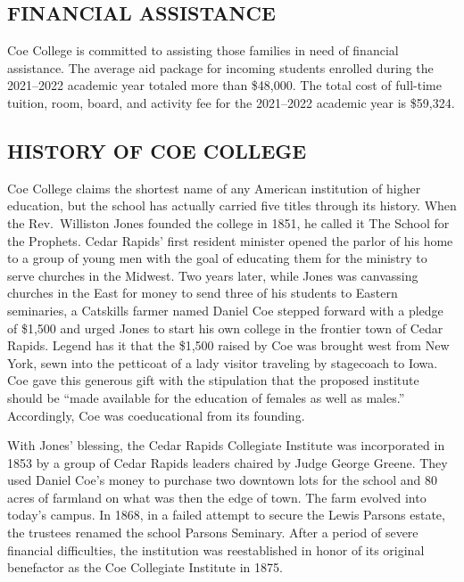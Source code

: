 \documentclass[
  letterpaper,
]{scrbook}
\begin{document}
\subsection{FINANCIAL ASSISTANCE}\label{financial-assistance}

Coe College is committed to assisting those families in need of
financial assistance. The average aid package for incoming students
enrolled during the 2021--2022 academic year totaled more than \$48,000.
The total cost of full-time tuition, room, board, and activity fee for
the 2021--2022 academic year is \$59,324.

\subsection{HISTORY OF COE COLLEGE}\label{sec-history-of-coe-college}

Coe College claims the shortest name of any American institution of
higher education, but the school has actually carried five titles
through its history. When the Rev.~Williston Jones founded the college
in 1851, he called it The School for the Prophets. Cedar Rapids' first
resident minister opened the parlor of his home to a group of young men
with the goal of educating them for the ministry to serve churches in
the Midwest. Two years later, while Jones was canvassing churches in the
East for money to send three of his students to Eastern seminaries, a
Catskills farmer named Daniel Coe stepped forward with a pledge of
\$1,500 and urged Jones to start his own college in the frontier town of
Cedar Rapids. Legend has it that the \$1,500 raised by Coe was brought
west from New York, sewn into the petticoat of a lady visitor traveling
by stagecoach to Iowa. Coe gave this generous gift with the stipulation
that the proposed institute should be ``made available for the education
of females as well as males.'' Accordingly, Coe was coeducational from
its founding.

With Jones' blessing, the Cedar Rapids Collegiate Institute was
incorporated in 1853 by a group of Cedar Rapids leaders chaired by Judge
George Greene. They used Daniel Coe's money to purchase two downtown
lots for the school and 80 acres of farmland on what was then the edge
of town. The farm evolved into today's campus. In 1868, in a failed
attempt to secure the Lewis Parsons estate, the trustees renamed the
school Parsons Seminary. After a period of severe financial
difficulties, the institution was reestablished in honor of its original
benefactor as the Coe Collegiate Institute in 1875.
\end{document}
